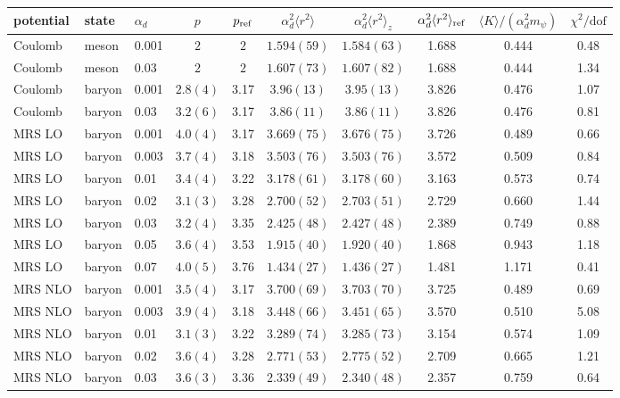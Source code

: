 \begin{table}[t]
\centering
\begin{tabular}{lllccccccc}
\hline\hline
potential & state & $\alpha_d$ & $p$ & $p_{\rm ref}$ & $\alpha_d^2\langle r^2\rangle$ & $\alpha_d^2\langle r^2\rangle_z$ & $\alpha_d^2\langle r^2\rangle_{\rm ref}$ & $\langle K\rangle/(\alpha_d^2m_\psi)$ & $\chi^2/\mathrm{dof}$\\
\hline
Coulomb & meson & 0.001 & $2$ & $2$ & $1.594(59)$ & $1.584(63)$ & 1.688 & 0.444 & 0.48\\
Coulomb & meson & 0.03 & $2$ & $2$ & $1.607(73)$ & $1.607(82)$ & 1.688 & 0.444 & 1.34\\
Coulomb & baryon & 0.001 & $2.8(4)$ & 3.17 & $3.96(13)$ & $3.95(13)$ & 3.826 & 0.476 & 1.07\\
Coulomb & baryon & 0.03 & $3.2(6)$ & 3.17 & $3.86(11)$ & $3.86(11)$ & 3.826 & 0.476 & 0.81\\
\hline
MRS LO & baryon & 0.001 & $4.0(4)$ & 3.17 & $3.669(75)$ & $3.676(75)$ & 3.726 & 0.489 & 0.66\\
MRS LO & baryon & 0.003 & $3.7(4)$ & 3.18 & $3.503(76)$ & $3.503(76)$ & 3.572 & 0.509 & 0.84\\
MRS LO & baryon & 0.01 & $3.4(4)$ & 3.22 & $3.178(61)$ & $3.178(60)$ & 3.163 & 0.573 & 0.74\\
MRS LO & baryon & 0.02 & $3.1(3)$ & 3.28 & $2.700(52)$ & $2.703(51)$ & 2.729 & 0.660 & 1.44\\
MRS LO & baryon & 0.03 & $3.2(4)$ & 3.35 & $2.425(48)$ & $2.427(48)$ & 2.389 & 0.749 & 0.88\\
MRS LO & baryon & 0.05 & $3.6(4)$ & 3.53 & $1.915(40)$ & $1.920(40)$ & 1.868 & 0.943 & 1.18\\
MRS LO & baryon & 0.07 & $4.0(5)$ & 3.76 & $1.434(27)$ & $1.436(27)$ & 1.481 & 1.171 & 0.41\\
MRS NLO & baryon & 0.001 & $3.5(4)$ & 3.17 & $3.700(69)$ & $3.703(70)$ & 3.725 & 0.489 & 0.69\\
MRS NLO & baryon & 0.003 & $3.9(4)$ & 3.18 & $3.448(66)$ & $3.451(65)$ & 3.570 & 0.510 & 5.08\\
MRS NLO & baryon & 0.01 & $3.1(3)$ & 3.22 & $3.289(74)$ & $3.285(73)$ & 3.154 & 0.574 & 1.09\\
MRS NLO & baryon & 0.02 & $3.6(4)$ & 3.28 & $2.771(53)$ & $2.775(52)$ & 2.709 & 0.665 & 1.21\\
MRS NLO & baryon & 0.03 & $3.6(3)$ & 3.36 & $2.339(49)$ & $2.340(48)$ & 2.357 & 0.759 & 0.64\\

\end{tabular}
\end{table}
